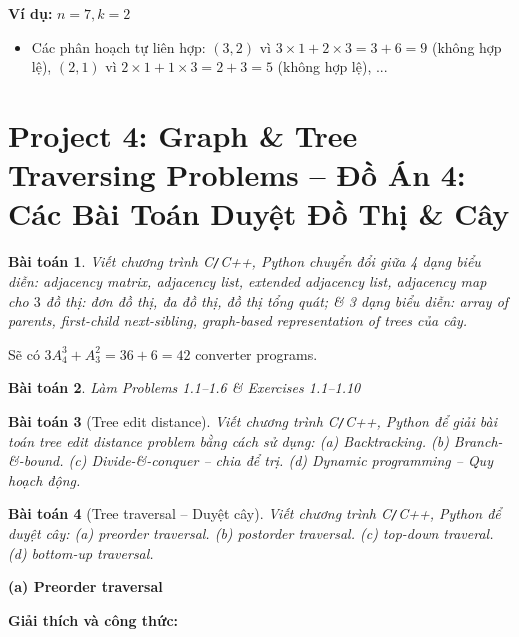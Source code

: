 \documentclass{article}
\newtheorem{baitoan}{Bài toán}
\begin{document}
\textbf{Ví dụ:} $n=7, k=2$
\begin{itemize}
    \item Các phân hoạch tự liên hợp: $(3,2)$ vì $3\times1 + 2\times3 = 3+6=9$ (không hợp lệ), $(2,1)$ vì $2\times1 + 1\times3 = 2+3=5$ (không hợp lệ), ...
\end{itemize}



\section{Project 4: Graph \& Tree Traversing Problems -- Đồ Án 4: Các Bài Toán Duyệt Đồ Thị \& Cây}
\begin{baitoan}
    Viết chương trình {\sf C{\tt/}C++, Python} chuyển đổi giữa 4 dạng biểu diễn: adjacency matrix, adjacency list, extended adjacency list, adjacency map cho $3$ đồ thị: đơn đồ thị, đa đồ thị, đồ thị tổng quát; \& 3 dạng biểu diễn: array of parents, first-child next-sibling, graph-based representation of trees của cây.
\end{baitoan}
Sẽ có $3A_4^3 + A_3^2 = 36 + 6 = 42$ converter programs.

\begin{baitoan}
    Làm Problems 1.1--1.6 \& Exercises 1.1--1.10
\end{baitoan}

\begin{baitoan}[Tree edit distance]
    Viết chương trình {\sf C{\tt/}C++, Python} để giải bài toán tree edit distance problem bằng cách sử dụng: (a) Backtracking. (b) Branch-\&-bound. (c) Divide-\&-conquer -- chia để trị. (d) Dynamic programming -- Quy hoạch động.
\end{baitoan}

\begin{baitoan}[Tree traversal -- Duyệt cây]
    Viết chương trình {\sf C{\tt/}C++, Python} để duyệt cây: (a) preorder traversal. (b) postorder traversal. (c) top-down traveral. (d) bottom-up traversal.
\end{baitoan}

\textbf{(a) Preorder traversal}

\textbf{Giải thích và công thức:}
\end{document}
